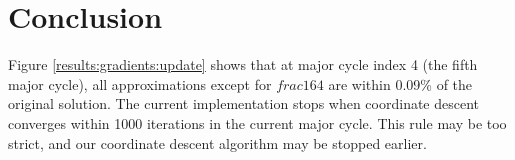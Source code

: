 \section{Conclusion}

Figure \ref{results:gradients:update} shows that at major cycle index 4 (the fifth major cycle), all approximations except for $frac{1}{64}$ are within 0.09\% of the original solution. The current implementation stops when coordinate descent converges within 1000 iterations in the current major cycle. This rule may be too strict, and our coordinate descent algorithm may be stopped earlier. 